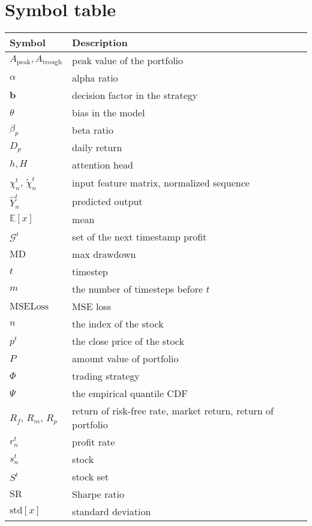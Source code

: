 \documentclass[preprint,12pt]{elsarticle}
\begin{document}
\section{Symbol table}
\begin{table}[]
{
    \centering
    \begin{tabular}{l|l}
      Symbol  & Description \\
         \hline
        $A_{\mathrm{peak}}, A_{\mathrm{trough}}$ & peak value of the portfolio\\
       $\alpha$  & alpha ratio \\
       $\mathbf{b}$ & decision factor in the strategy\\
       $\theta$  & bias in the model \\
       $\beta_p$  & beta ratio \\
       $D_p$ & daily return \\
       $h, H$  & attention head \\
       $\chi^t_n$, $\tilde{\chi}^t_n$  & input feature matrix, normalized sequence \\
       $\hat{Y}^t_n$    & predicted output \\
       $\mathbb{E}[x]$  &  mean \\
       $\mathcal{G}^t$   &  set of the next timestamp profit \\
       $\mathrm{MD}$ & max drawdown \\
       $t$ & timestep \\ 
       $m$  & the number of timesteps before $t$ \\
       $\mathrm{MSELoss}$   & MSE loss \\
       $n$   &  the index of the stock \\
       $p^t$  & the close price of the stock \\
       $P$  & amount value of portfolio \\
       $\Phi$  & trading strategy \\
       $\Psi$  & the empirical quantile CDF \\
       $R_f$, $R_m$, $R_p$  & return of risk-free rate, market return, return of portfolio \\
       $r^t_n$ & profit rate \\
       $s^t_n$  &  stock \\
       $S^t$   & stock set \\
       $\mathrm{SR}$  &  Sharpe ratio \\
       $\mathrm{std}[x]$ & standard deviation \\

\end{tabular}}
\end{table}
\end{document}
